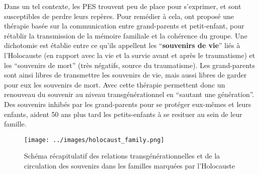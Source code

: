 \documentclass[french]{article}
\begin{document}
			Dans un tel contexte, les PES trouvent peu de place pour s'exprimer, et sont susceptibles de perdre leurs repères. Pour remédier à cela, \cite{fossion2003} ont proposé une thérapie basée sur la communication entre grand-parents et petit-enfant, pour rétablir la transmission de la mémoire familiale et la cohérence du groupe. Une dichotomie est établie entre ce qu'ils appellent les ``\textbf{souvenirs de vie}'' liés à l'Holocauste (en rapport avec la vie et la survie avant et après le traumatisme) et les ``souvenirs de mort'' (très négatifs, source du traumatisme). Les grand-parents sont ainsi libres de transmettre les souvenirs de vie, mais aussi libres de garder pour eux les souvenirs de mort. Avec cette thérapie \cite{fossion2003} permettent donc un renouveau du souvenir au niveau transgénérationnel en ``sautant une génération''. Des souvenirs inhibés par les grand-parents pour se protéger eux-mêmes et leurs enfants, aident 50 ans plus tard les petits-enfants à se resituer au sein de leur famille.
			\begin{figure}[H]
				\centering
				\texttt{[image: ../images/holocaust\_family.png]}
				\caption{Schéma récapitulatif des relations transgénérationnelles et de la circulation des souvenirs dans les familles marquées par l'Holocauste}
			\end{figure}
			
			
			
		
			
\end{document}
